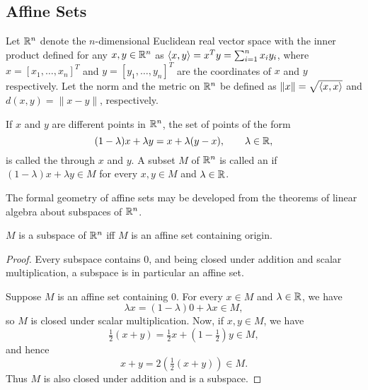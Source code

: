 \documentclass[11pt,a4paper]{article}
\begin{document}
\subsection{Affine Sets}

Let $\mathbb{R}^n$ denote the $n$-dimensional Euclidean real vector space with the inner product defined for any $x,y\in \mathbb{R}^n$ as $\langle x, y \rangle = x^Ty = \sum_{i=1}^n x_i y_i$, where $x = [x_1,\ldots, x_n]^T$ and $y = [y_1,\ldots, y_n]^T$ are the coordinates of $x$ and $y$ respectively. Let the norm and the metric on $\mathbb{R}^n$ be defined as $\|x\| = \sqrt{\langle x, x \rangle}$ and $d(x,y) = \|x-y\|$, respectively.

\begin{definition}
    If $x$ and $y$ are different points in $\mathbb{R}^n$, the set of points of the form 
    \begin{equation*}
        (1-\lambda) x + \lambda y = x + \lambda (y-x), \qquad \lambda \in \mathbb{R},
    \end{equation*}
    is called the  through $x$ and $y$. A subset $M$ of $\mathbb{R}^n$ is called an  if $(1 - \lambda) x + \lambda y \in M$ for every $x,y\in M$ and $\lambda \in \mathbb{R}$.
\end{definition}

The formal geometry of affine sets may be developed from the theorems of linear algebra about subspaces of $\mathbb{R}^n$.

\begin{theorem}\label{thm:subspace_affine}
    $M$ is a subspace of $\mathbb{R}^n$ iff $M$ is an affine set containing origin.
\end{theorem}

\begin{proof}
    \forward Every subspace contains $0$, and being closed under addition and scalar multiplication, a subspace is in particular an affine set.

    \noindent\converse Suppose $M$ is an affine set containing $0$. For every $x\in M$ and $\lambda\in \mathbb{R}$, we have
    \begin{equation*}
        \lambda x = (1-\lambda) 0 + \lambda x \in M,
    \end{equation*} 
    so $M$ is closed under scalar multiplication. Now, if $x, y\in M$, we have
    \begin{equation*}
        \tfrac{1}{2}(x+y) = \tfrac{1}{2} x + (1-\tfrac{1}{2}) y \in M,
    \end{equation*}
    and hence 
    \begin{equation*}
        x+y = 2(\tfrac{1}{2}(x+y)) \in M.
    \end{equation*}
    Thus $M$ is also closed under addition and is a subspace.
\end{proof}
\end{document}
